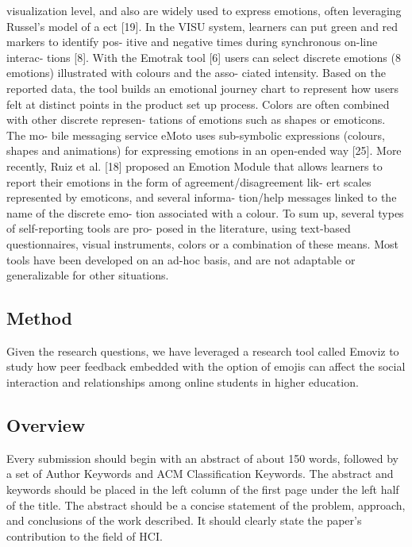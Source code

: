 \documentclass[chi_draft]{sigchi}
\begin{document}
visualization level, and also are widely used to express emotions, often leveraging Russel's model of a ect [19]. In the VISU system, learners can put green and red markers to identify pos- itive and negative times during synchronous on-line interac- tions [8]. With the Emotrak tool [6] users can select discrete emotions (8 emotions) illustrated with colours and the asso- ciated intensity. Based on the reported data, the tool builds an emotional journey chart to represent how users felt at distinct points in the product set up process. Colors are often combined with other discrete represen- tations of emotions such as shapes or emoticons. The mo- bile messaging service eMoto uses sub-symbolic expressions (colours, shapes and animations) for expressing emotions in an open-ended way [25]. More recently, Ruiz et al. [18] proposed an Emotion Module that allows learners to report their emotions in the form of agreement/disagreement lik- ert scales represented by emoticons, and several informa- tion/help messages linked to the name of the discrete emo- tion associated with a colour. To sum up, several types of self-reporting tools are pro- posed in the literature, using text-based questionnaires, visual instruments, colors or a combination of these means. Most tools have been developed on an ad-hoc basis, and are not adaptable or generalizable for other situations.

\subsection{Method}

Given the research questions, we have leveraged a research tool called Emoviz to study how peer feedback embedded with the option of emojis can affect the social interaction and relationships among online students in higher education. 

\subsection{Overview}

Every submission should begin with an abstract of about 150 words,
followed by a set of Author Keywords and ACM Classification
Keywords. The abstract and keywords should be placed in the left
column of the first page under the left half of the title. The
abstract should be a concise statement of the problem, approach, and
conclusions of the work described. It should clearly state the paper's
contribution to the field of HCI\@.
\end{document}
